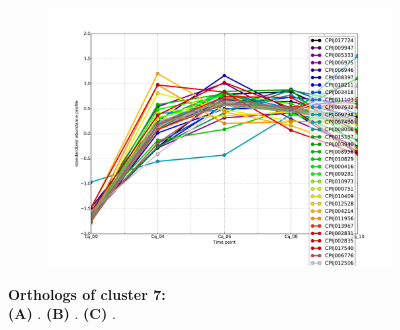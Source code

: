 \begin{figure}[hp]
\begin{subfigure}[t]{.5\linewidth}
\includegraphics[width=\linewidth]{figures/figs/ecr_and_insects_ptci_20130903/upAfter4_gene_profiles_from_cummerbund/Cq_upAfter4_cls7_Ag_target_FPKMs_vb_orthos.pdf}
\caption{}
\label{fig:cluster7-Cq}
\end{subfigure}
% 
\caption[Orthologs of cluster 7]{\sf \textbf{Orthologs of cluster 7:}\\

\textbf{(A)} \Aa.
\textbf{(B)} \Ag.
\textbf{(C)} \Cq.
}
\label{fig:cluster7}
\end{figure}